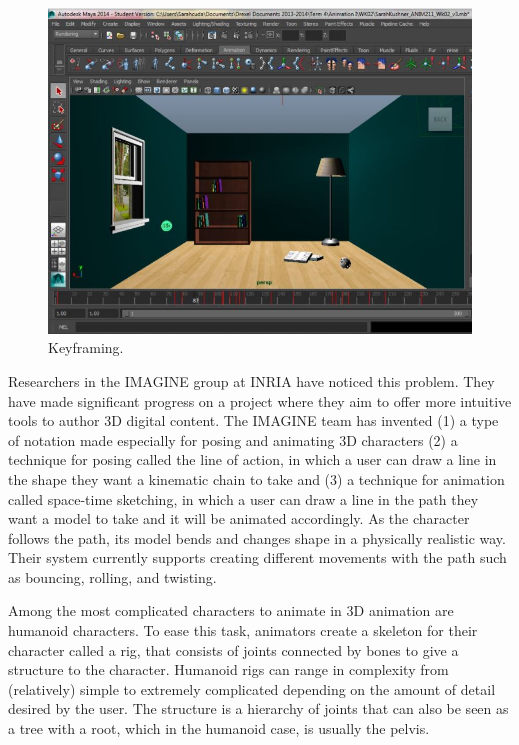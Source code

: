 \documentclass[12pt, a4paper]{memoir}
\begin{document}
\begin{figure}
\centering
\includegraphics[scale=0.4]{img/keyframe}
\caption{Keyframing.}
\end{figure}

Researchers in the IMAGINE group at INRIA have noticed this problem. They have made significant progress on a project where they aim to offer more intuitive tools to author 3D digital content. The IMAGINE team has invented (1) a type of notation made especially for posing and animating 3D characters (2) a technique for posing called the line of action, in which a user can draw a line in the shape they want a kinematic chain to take and (3) a technique for animation called space-time sketching, in which a user can draw a line in the path they want a model to take and it will be animated accordingly. As the character follows the path, its model bends and changes shape in a physically realistic way. Their system currently supports creating different movements with the path such as bouncing, rolling, and twisting.

Among the most complicated characters to animate in 3D animation are humanoid characters. To ease this task, animators create a skeleton for their character called a rig, that consists of joints connected by bones to give a structure to the character. Humanoid rigs can range in complexity from (relatively) simple to extremely complicated depending on the amount of detail desired by the user. The structure is a hierarchy of joints that can also be seen as a tree with a root, which in the humanoid case, is usually the pelvis.
\end{document}

